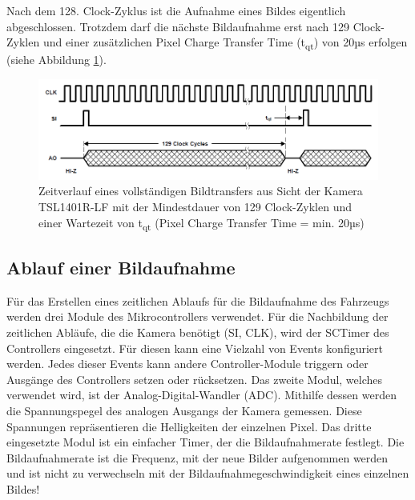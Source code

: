 Nach dem 128. Clock-Zyklus ist die Aufnahme eines Bildes eigentlich abgeschlossen. Trotzdem darf die nächste Bildaufnahme erst nach 129 Clock-Zyklen und einer zusätzlichen \glqq{}Pixel Charge Transfer Time\grqq{} (t\textsubscript{qt}) von 20µs erfolgen (siehe Abbildung \ref{fig:TimingWaveform}).

\begin{figure}[H] %
\includegraphics[width=.95\textwidth]{sec7/images/TimingWaveform} 
\centering
\captionsetup{width=.95\textwidth}
\caption[Zeitverlauf eines vollständigen Bildtransfers aus Sicht der Kamera ~\protect\cite{Taos}]{Zeitverlauf eines vollständigen Bildtransfers aus Sicht der Kamera TSL1401R-LF mit der Mindestdauer von 129 Clock-Zyklen und einer Wartezeit von t\textsubscript{qt} (\glqq{}Pixel Charge Transfer Time\grqq{} = min. 20µs)  ~\protect\cite{Taos}}\centering
\label{fig:TimingWaveform}
\end{figure}


\newpage
\subsection{Ablauf einer Bildaufnahme}\label{Sec7Sub2}

Für das Erstellen eines zeitlichen Ablaufs für die Bildaufnahme des Fahrzeugs werden drei Module des Mikrocontrollers verwendet. Für die Nachbildung der zeitlichen Abläufe, die die Kamera benötigt (SI, CLK), wird der SCTimer des Controllers eingesetzt. Für diesen kann eine Vielzahl von Events konfiguriert werden. Jedes dieser Events kann andere Controller-Module triggern oder Ausgänge des Controllers setzen oder rücksetzen. Das zweite Modul, welches verwendet wird, ist der Analog-Digital-Wandler (ADC). Mithilfe dessen werden die Spannungspegel des analogen Ausgangs der Kamera gemessen. Diese Spannungen repräsentieren die Helligkeiten der einzelnen Pixel. Das dritte eingesetzte Modul ist ein einfacher Timer, der die Bildaufnahmerate festlegt. Die Bildaufnahmerate ist die Frequenz, mit der neue Bilder aufgenommen werden und ist nicht zu verwechseln mit der Bildaufnahmegeschwindigkeit eines einzelnen Bildes!\vspace{11pt}

